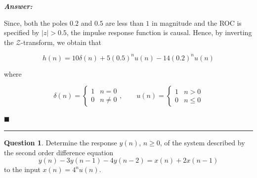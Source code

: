 \documentclass[12pt]{article}
\theoremstyle{definition}
\newtheorem{question}{Question}
\newenvironment{answer}{
    \textbf{\textit{Answer:}} \qquad
}{\hfill $\blacksquare$ \\ 

\begin{center}
    \rule{0.8\linewidth}{1.5px} 
    \vspace*{1cm}   
\end{center}
}
\newcommand{\zcal}{\mathcal{Z}}
\begin{document}
\begin{answer}
\begin{enumerate}
        Since, both the poles $0.2$ and $0.5$ are less than $1$ in magnitude and the ROC is specified by $\vert z \vert > 0.5$, the impulse response function is causal. Hence, by inverting the $\zcal$-transform, we obtain that 

        $$
        h(n) = 10\delta(n) + 5 (0.5)^n u(n) - 14 (0.2)^n u(n)
        $$

        where 

        $$
        \delta(n) = \begin{cases}
            1 & n = 0\\
            0 & n \neq 0
        \end{cases},
        \qquad
        u(n) = \begin{cases}
            1 & n > 0\\
            0 & n \leq 0
        \end{cases}
        $$

    \end{enumerate}
\end{answer}



\begin{question}
    Determine the response $y(n)$, $n \geq 0$, of the system described by the second order difference equation 
    $$
    y(n) - 3y(n-1) - 4y(n-2) = x(n) + 2 x(n-1)
    $$
    to the input $x(n) = 4^n u(n)$.
\end{question}
\end{document}
